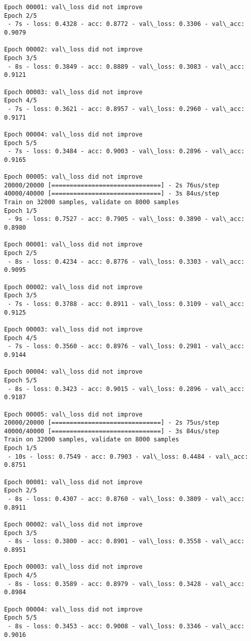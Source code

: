 \documentclass[11pt]{article}
\begin{document}
\begin{Verbatim}[commandchars=\\\{\}]
Epoch 00001: val\_loss did not improve
Epoch 2/5
 - 7s - loss: 0.4328 - acc: 0.8772 - val\_loss: 0.3306 - val\_acc: 0.9079

Epoch 00002: val\_loss did not improve
Epoch 3/5
 - 8s - loss: 0.3849 - acc: 0.8889 - val\_loss: 0.3083 - val\_acc: 0.9121

Epoch 00003: val\_loss did not improve
Epoch 4/5
 - 7s - loss: 0.3621 - acc: 0.8957 - val\_loss: 0.2960 - val\_acc: 0.9171

Epoch 00004: val\_loss did not improve
Epoch 5/5
 - 7s - loss: 0.3484 - acc: 0.9003 - val\_loss: 0.2896 - val\_acc: 0.9165

Epoch 00005: val\_loss did not improve
20000/20000 [==============================] - 2s 76us/step
40000/40000 [==============================] - 3s 84us/step
Train on 32000 samples, validate on 8000 samples
Epoch 1/5
 - 9s - loss: 0.7527 - acc: 0.7905 - val\_loss: 0.3890 - val\_acc: 0.8980

Epoch 00001: val\_loss did not improve
Epoch 2/5
 - 8s - loss: 0.4234 - acc: 0.8776 - val\_loss: 0.3303 - val\_acc: 0.9095

Epoch 00002: val\_loss did not improve
Epoch 3/5
 - 7s - loss: 0.3788 - acc: 0.8911 - val\_loss: 0.3109 - val\_acc: 0.9125

Epoch 00003: val\_loss did not improve
Epoch 4/5
 - 7s - loss: 0.3560 - acc: 0.8976 - val\_loss: 0.2981 - val\_acc: 0.9144

Epoch 00004: val\_loss did not improve
Epoch 5/5
 - 8s - loss: 0.3423 - acc: 0.9015 - val\_loss: 0.2896 - val\_acc: 0.9187

Epoch 00005: val\_loss did not improve
20000/20000 [==============================] - 2s 75us/step
40000/40000 [==============================] - 3s 84us/step
Train on 32000 samples, validate on 8000 samples
Epoch 1/5
 - 10s - loss: 0.7549 - acc: 0.7903 - val\_loss: 0.4484 - val\_acc: 0.8751

Epoch 00001: val\_loss did not improve
Epoch 2/5
 - 8s - loss: 0.4307 - acc: 0.8760 - val\_loss: 0.3809 - val\_acc: 0.8911

Epoch 00002: val\_loss did not improve
Epoch 3/5
 - 8s - loss: 0.3800 - acc: 0.8901 - val\_loss: 0.3558 - val\_acc: 0.8951

Epoch 00003: val\_loss did not improve
Epoch 4/5
 - 8s - loss: 0.3589 - acc: 0.8979 - val\_loss: 0.3428 - val\_acc: 0.8984

Epoch 00004: val\_loss did not improve
Epoch 5/5
 - 8s - loss: 0.3453 - acc: 0.9008 - val\_loss: 0.3346 - val\_acc: 0.9016


\end{Verbatim}
\end{document}
